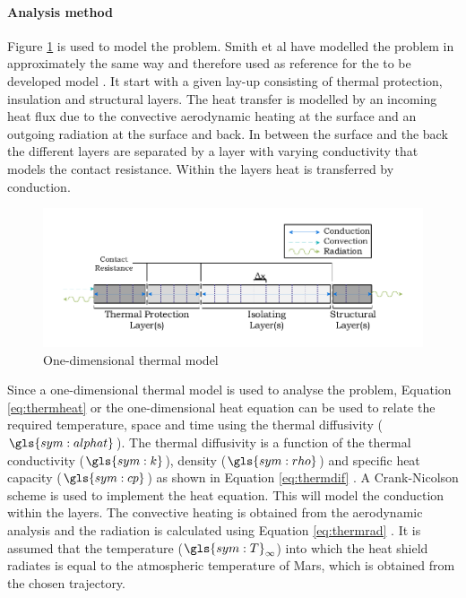 \paragraph{Analysis method}
Figure \ref{fig:1dmodelthermal} is used to model the problem. Smith et al have modelled the problem in approximately the same way and therefore used as reference for the to be developed model \cite{Smith2011}. It start with a given lay-up consisting of thermal protection, insulation and structural layers. The heat transfer is modelled by an incoming heat flux due to the convective aerodynamic heating at the surface and an outgoing radiation at the surface and back. In between the surface and the back the different layers are separated by a layer with varying conductivity that models the contact resistance. Within the layers heat is transferred by conduction.

\begin{figure}[ht]
	\centering
	\includegraphics{./Figure/Thermal/1dmodelthermal.pdf}
	\caption{One-dimensional thermal model}
	\label{fig:1dmodelthermal}
\end{figure}

Since a one-dimensional thermal model is used to analyse the problem, Equation \eqref{eq:thermheat} or the one-dimensional heat equation can be used to relate the required temperature, space and time using the thermal diffusivity ($\gls{sym:alphat}$). The thermal diffusivity is a function of the thermal conductivity ($\gls{sym:k}$), density ($\gls{sym:rho}$) and specific heat capacity ($\gls{sym:cp}$) as shown in Equation \eqref{eq:thermdif} \cite{Holman2002}. A Crank-Nicolson scheme is used to implement the heat equation. This will model the conduction within the layers. The convective heating is obtained from the aerodynamic analysis and the radiation is calculated using Equation \eqref{eq:thermrad} \cite{Holman2002}. It is assumed that the temperature ($\gls{sym:T}_\infty$) into which the heat shield radiates is equal to the atmospheric temperature of Mars, which is obtained from the chosen trajectory.

